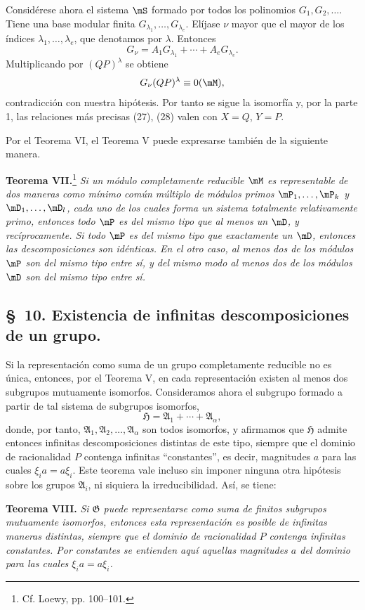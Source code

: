 \documentclass[11pt]{article}
\begin{document}
Considérese ahora el sistema $\mS$ formado por todos los polinomios $G_1,G_2,\ldots$. Tiene una base modular finita $G_{\lambda_1},\ldots,G_{\lambda_e}$. Elíjase $\nu$ mayor que el mayor de los índices $\lambda_1,\ldots,\lambda_e$, que denotamos por $\lambda$. Entonces
\[
 G_\nu=A_1G_{\lambda_1}+\cdots+A_eG_{\lambda_e}.
\]
Multiplicando por $(QP)^\lambda$ se obtiene
\[
 G_\nu(QP)^\lambda\equiv0(\mM),
\]
contradicción con nuestra hipótesis. Por tanto se sigue la isomorfía y, por la parte 1, las relaciones más precisas (27), (28) valen con $X=Q$, $Y=P$.

Por el Teorema VI, el Teorema V puede expresarse también de la siguiente manera.

\textbf{Teorema VII.}\footnote{Cf. Loewy, pp. 100--101.} \emph{Si un módulo completamente reducible $\mM$ es representable de dos maneras como mínimo común múltiplo de módulos primos $\mP_1,\ldots,\mP_k$ y $\mD_1,\ldots,\mD_l$, cada uno de los cuales forma un sistema totalmente relativamente primo, entonces todo $\mP$ es del mismo tipo que al menos un $\mD$, y recíprocamente. Si todo $\mP$ es del mismo tipo que exactamente un $\mD$, entonces las descomposiciones son idénticas. En el otro caso, al menos dos de los módulos $\mP$ son del mismo tipo entre sí, y del mismo modo al menos dos de los módulos $\mD$ son del mismo tipo entre sí.}

\setcounter{footnote}{19}
\subsection*{\S~10. Existencia de infinitas descomposiciones de un grupo.}

Si la representación como suma de un grupo completamente reducible no es única, entonces, por el Teorema V, en cada representación existen al menos dos subgrupos mutuamente isomorfos. Consideramos ahora el subgrupo formado a partir de tal sistema de subgrupos isomorfos,
\[
  \mathfrak H=\mathfrak A_1+\cdots+\mathfrak A_\alpha,
\]
donde, por tanto, $\mathfrak A_1,\mathfrak A_2,\ldots,\mathfrak A_\alpha$ son todos isomorfos, y afirmamos que $\mathfrak H$ admite entonces infinitas descomposiciones distintas de este tipo, siempre que el dominio de racionalidad $P$ contenga infinitas ``constantes'', es decir, magnitudes $a$ para las cuales $\xi_i a=a\xi_i$. Este teorema vale incluso sin imponer ninguna otra hipótesis sobre los grupos $\mathfrak A_i$, ni siquiera la irreducibilidad. Así, se tiene:

\textbf{Teorema VIII.} \emph{Si $\mathfrak G$ puede representarse como suma de finitos subgrupos mutuamente isomorfos, entonces esta representación es posible de infinitas maneras distintas, siempre que el dominio de racionalidad $P$ contenga infinitas constantes. Por constantes se entienden aquí aquellas magnitudes $a$ del dominio para las cuales $\xi_i a=a\xi_i$.}
\end{document}
